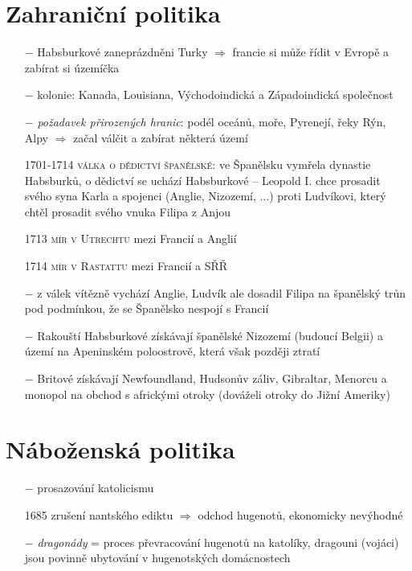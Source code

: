 \documentclass{article}
\begin{document}
\section*{Zahraniční politika}
\begin{itemize}
    \vspace{-0.5em}
    \setlength\itemsep{0.15em}
    \item[$-$] Habsburkové zaneprázdněni Turky $\Rightarrow$ francie si může řídit v Evropě a zabírat si územíčka
    \item[$-$] kolonie: Kanada, Louisiana, Východoindická a Západoindická společnost
    \item[$-$] \textit{požadavek přirozených hranic}: podél oceánů, moře, Pyrenejí, řeky Rýn, Alpy $\Rightarrow$ začal válčit a zabírat některá území
    \item[1701-1714] \textsc{válka o dědictví španělské}: ve Španělsku vymřela dynastie Habsburků, o dědictví se uchází Habsburkové -- Leopold I. chce prosadit svého syna Karla a spojenci (Anglie, Nizozemí, ...) proti Ludvíkovi, který chtěl prosadit svého vnuka Filipa z Anjou
    \item[1713] \textsc{mír v Utrechtu} mezi Francií a Anglií
    \item[1714] \textsc{mír v Rastattu} mezi Francií a SŘŘ
    \item[$-$] z válek vítězně vychází Anglie, Ludvík ale dosadil Filipa na španělský trůn pod podmínkou, že se Španělsko nespojí s Francií
    \item[$-$] Rakouští Habsburkové získávají španělské Nizozemí (budoucí Belgii) a území na Apeninském poloostrově, která však později ztratí
    \item[$-$] Britové získávají Newfoundland, Hudsonův záliv, Gibraltar, Menorcu a monopol na obchod s africkými otroky (dováželi otroky do Jižní Ameriky)
\end{itemize}


\section*{Náboženská politika}
\begin{itemize}
    \vspace{-0.5em}
    \setlength\itemsep{0.15em}
    \item[$-$] prosazování katolicismu
    \item[1685] zrušení nantského ediktu $\Rightarrow$ odchod hugenotů, ekonomicky nevýhodné
    \item[$-$] \textit{dragonády} = proces převracování hugenotů na katolíky, dragouni (vojáci) jsou povinně ubytování v hugenotských domácnostech
\end{itemize}
\end{document}
